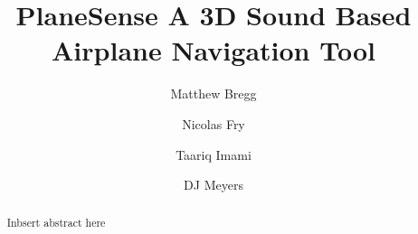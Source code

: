 \documentclass[format=acmsmall, review=false, screen=true]{acmart}
\begin{document}
\title[PlaneSense]{PlaneSense \newline A 3D Sound Based Airplane Navigation Tool}

\author{Matthew Bregg}
\author{Nicolas Fry}
\author{Taariq Imami}
\author{DJ Meyers}

\begin{abstract}
  Inbsert abstract here
\end{abstract}






\maketitle

\renewcommand{\shortauthors}{M. Bregg T. Imami D. Meyers N. Fry}


\end{document}
